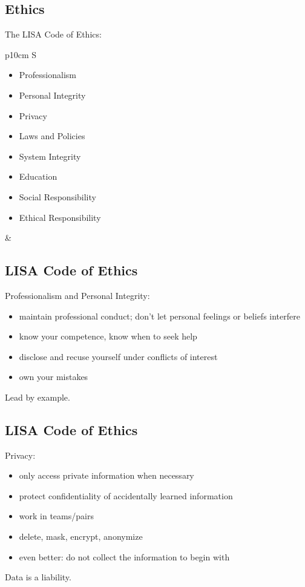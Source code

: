 \documentclass[xga]{xdvislides}
\begin{document}
\subsection{Ethics}
The LISA Code of Ethics:
\\

\begin{tabular}{ p{10cm} S }
\begin{itemize}
	\item Professionalism
	\item Personal Integrity
	\item Privacy
	\item Laws and Policies
	\item System Integrity
	\item Education
	\item Social Responsibility
	\item Ethical Responsibility
\end{itemize}
&  \\
\end{tabular}

\subsection{LISA Code of Ethics}
Professionalism and Personal Integrity:

\begin{itemize}
	\item maintain professional conduct; don't let
personal feelings or beliefs interfere
	\item know your competence, know when to seek help
	\item disclose and recuse yourself under conflicts of interest
	\item own your mistakes
\end{itemize}
\vspace{.5in}
Lead by example.

\subsection{LISA Code of Ethics}
Privacy:
\begin{itemize}
	\item only access private information when necessary
	\item protect confidentiality of accidentally learned information
	\item work in teams/pairs
	\item delete, mask, encrypt, anonymize
	\item even better: do not collect the information to begin with
\end{itemize}
\vspace{.5in}
Data is a liability.
\end{document}
